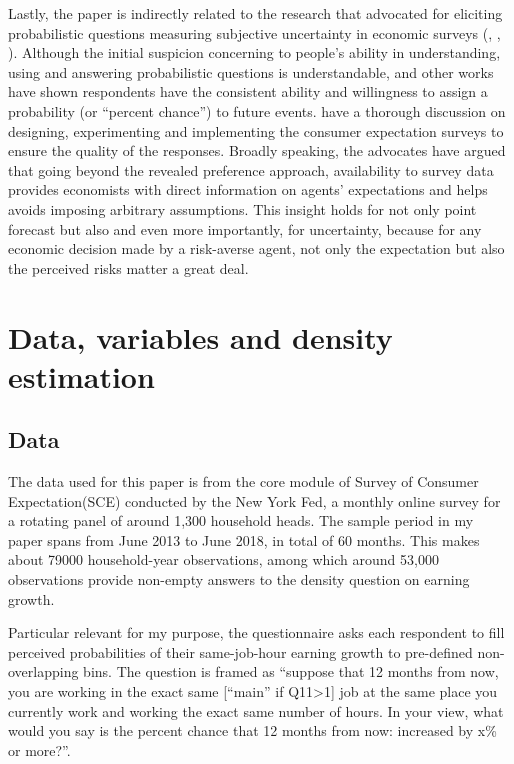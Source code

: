 \documentclass[12pt,notitlepage,onecolumn,aps,pra]{article}
\begin{document}
Lastly, the paper is indirectly related to the research that advocated
for eliciting probabilistic questions measuring subjective uncertainty
in economic surveys (\cite{manski_measuring_2004},
\cite{delavande2011measuring}, \cite{manski_survey_2018}). Although the
initial suspicion concerning to people's ability in understanding, using
and answering probabilistic questions is understandable,
\cite{bertrand_people_2001} and other works have shown respondents have
the consistent ability and willingness to assign a probability (or
``percent chance'') to future events. \cite{armantier_overview_2017}
have a thorough discussion on designing, experimenting and implementing
the consumer expectation surveys to ensure the quality of the responses.
Broadly speaking, the advocates have argued that going beyond the
revealed preference approach, availability to survey data provides
economists with direct information on agents' expectations and helps
avoids imposing arbitrary assumptions. This insight holds for not only
point forecast but also and even more importantly, for uncertainty,
because for any economic decision made by a risk-averse agent, not only
the expectation but also the perceived risks matter a great deal.


    \hypertarget{data-variables-and-density-estimation}{%
\section{Data, variables and density
estimation}\label{data-variables-and-density-estimation}}

\hypertarget{data}{%
\subsection{Data}\label{data}}

The data used for this paper is from the core module of Survey of
Consumer Expectation(SCE) conducted by the New York Fed, a monthly
online survey for a rotating panel of around 1,300 household heads. The
sample period in my paper spans from June 2013 to June 2018, in total of
60 months. This makes about 79000 household-year observations, among
which around 53,000 observations provide non-empty answers to the
density question on earning growth.

Particular relevant for my purpose, the questionnaire asks each
respondent to fill perceived probabilities of their same-job-hour
earning growth to pre-defined non-overlapping bins. The question is
framed as ``suppose that 12 months from now, you are working in the
exact same {[}``main'' if Q11\textgreater{}1{]} job at the same place
you currently work and working the exact same number of hours. In your
view, what would you say is the percent chance that 12 months from now:
increased by x\% or more?''.
\end{document}
